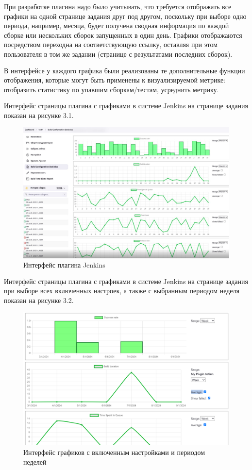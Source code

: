 При разработке плагина надо было учитывать, что требуется отображать все графики на одной странице задания друг под другом, поскольку при выборе одно периода, например, месяца, будет получена сводная информация по каждой сборке или нескольких сборок запущенных в один день. Графики отображаются посредством переходна на соответствующую ссылку, оставляя при этом пользователя в том же задании (странице с результатами последних сборок).

В интерфейсе у каждого графика были реализованы те дополнительные функции отображения, которые могут быть применены к визуализируемой метрике: отобразить статистику по упавшим сборкам/тестам, усреднить метрику.

Интерфейс страницы плагина с графиками в системе Jenkins на странице задания показан на рисунке 3.1.


\begin{figure}[ht!] 
	\center
	\includegraphics [scale=0.47] {my_folder/images//ui}
	\caption{Интерфейс плагина Jenkins} 
	\label{fig:ArchitectureJenkins}  
\end{figure}

Интерфейс страницы плагина с графиками в системе Jenkins на странице задания при выборе всех включенных настроек, а также с выбранным периодом неделя показан на рисунке 3.2.

\begin{figure}[ht!] 
	\center
	\includegraphics [scale=0.47] {my_folder/images//ui4}
	\caption{Интерфейс графиков с включенным настройками и периодом неделей} 
	\label{fig:ArchitectureJenkins}  
\end{figure}

